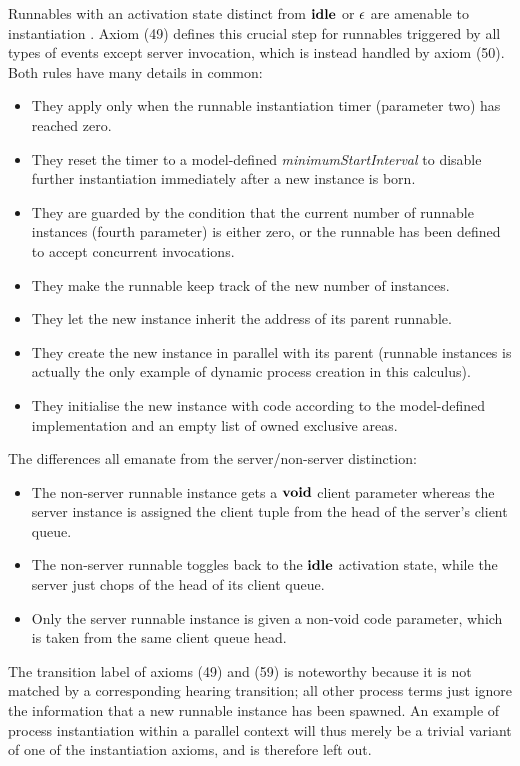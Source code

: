 \documentclass[10pt,conference]{IEEEtran}
\begin{document}
Runnables with an activation state distinct from $\textbf{idle}$ or $\epsilon$ are amenable to instantiation \cite[ch.~4.2.3]{AR:RTE}. Axiom (49) defines this crucial step for runnables triggered by all types of events except server invocation, which is instead handled by axiom (50). Both rules have many details in common:
\begin{itemize}
\item They apply only when the runnable instantiation timer (parameter two) has reached zero.
\item They reset the timer to a model-defined \emph{minimumStartInterval} to disable further instantiation immediately after a new instance is born.
\item They are guarded by the condition that the current number of runnable instances (fourth parameter) is either zero, or the runnable has been defined to accept concurrent invocations.
\item They make the runnable keep track of the new number of instances.
\item They let the new instance inherit the address of its parent runnable.
\item They create the new instance in parallel with its parent (runnable instances is actually the only example of dynamic process creation in this calculus).
\item They initialise the new instance with code according to the model-defined implementation and an empty list of owned exclusive areas.
\end{itemize}
The differences all emanate from the server/non-server distinction:
\begin{itemize}
\item The non-server runnable instance gets a $\textbf{void}$ client parameter whereas the server instance is assigned the client tuple from the head of the server's client queue.
\item The non-server runnable toggles back to the $\textbf{idle}$ activation state, while the server just chops of the head of its client queue.
\item Only the server runnable instance is given a non-void code parameter, which is taken from the same client queue head.
\end{itemize}
The transition label of axioms (49) and (59) is noteworthy because it is not matched by a corresponding hearing transition; all other process terms just ignore the information that a new runnable instance has been spawned. An example of process instantiation within a parallel context will thus merely be a trivial variant of one of the instantiation axioms, and is therefore left out.
\end{document}
